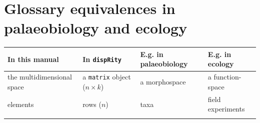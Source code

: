 \documentclass[]{book}
\theoremstyle{definition}
\theoremstyle{definition}
\theoremstyle{remark}
\begin{document}
\section{Glossary equivalences in palaeobiology and
ecology}\label{glossary-equivalences-in-palaeobiology-and-ecology}

\begin{longtable}[]{@{}llll@{}}
\toprule
\begin{minipage}[b]{0.20\columnwidth}\raggedright\strut
In this manual\strut
\end{minipage} & \begin{minipage}[b]{0.20\columnwidth}\raggedright\strut
In \texttt{dispRity}\strut
\end{minipage} & \begin{minipage}[b]{0.23\columnwidth}\raggedright\strut
E.g. in palaeobiology\strut
\end{minipage} & \begin{minipage}[b]{0.17\columnwidth}\raggedright\strut
E.g. in ecology\strut
\end{minipage}\tabularnewline
\midrule
\endhead
\begin{minipage}[t]{0.20\columnwidth}\raggedright\strut
the multidimensional space\strut
\end{minipage} & \begin{minipage}[t]{0.20\columnwidth}\raggedright\strut
a \texttt{matrix} object (\(n\times k\))\strut
\end{minipage} & \begin{minipage}[t]{0.23\columnwidth}\raggedright\strut
a morphospace\strut
\end{minipage} & \begin{minipage}[t]{0.17\columnwidth}\raggedright\strut
a function-space\strut
\end{minipage}\tabularnewline
\begin{minipage}[t]{0.20\columnwidth}\raggedright\strut
elements\strut
\end{minipage} & \begin{minipage}[t]{0.20\columnwidth}\raggedright\strut
rows (\(n\))\strut
\end{minipage} & \begin{minipage}[t]{0.23\columnwidth}\raggedright\strut
taxa\strut
\end{minipage} & \begin{minipage}[t]{0.17\columnwidth}\raggedright\strut
field experiments\strut
\end{minipage}\tabularnewline
\begin{minipage}[t]{0.20\columnwidth}\raggedright\strut

\end{minipage}
\end{longtable}
\end{document}
